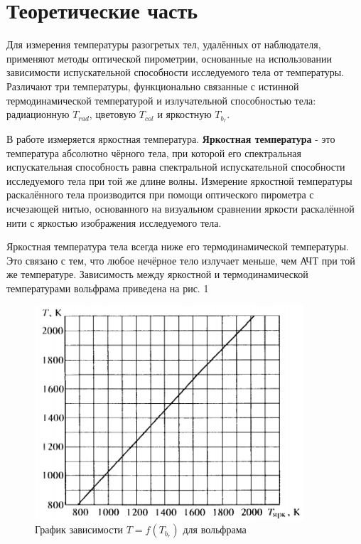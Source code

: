 \documentclass[a4paper, 12pt]{article}
\begin{document}
\section{Теоретические часть}
Для измерения температуры разогретых тел, удалённых от наблюдателя, применяют методы оптической пирометрии, основанные на использовании зависимости испускательной способности исследуемого тела от температуры. Различают три температуры, функционально связанные с истинной термодинамической температурой и излучательной способностью тела: радиационную $T_{rad}$, цветовую $T_{col}$ и яркостную $T_b_r$. \par
В работе измеряется яркостная температура. \textbf{Яркостная температура} - это температура абсолютно чёрного тела, при которой его спектральная испускательная способность равна спектральной испускательной способности исследуемого тела при той же длине волны.
 Измерение яркостной температуры раскалённого тела производится при помощи оптического пирометра с исчезающей нитью, основанного на визуальном сравнении яркости раскалённой нити с яркостью изображения исследуемого тела. \par
Яркостная температура тела всегда ниже его термодинамической температуры. Это связано с тем, что любое нечёрное тело излучает меньше, чем АЧТ при той же температуре. Зависимость между яркостной и термодинамической температурами вольфрама приведена на рис. 1

\begin{figure}[h]
    \centering
    \includegraphics[width=10cm]{fig2.PNG}
    \caption{График зависимости $T = f(T_b_r)$ для вольфрама}
    \label{fig:vac}
\end{figure}
\end{document}
